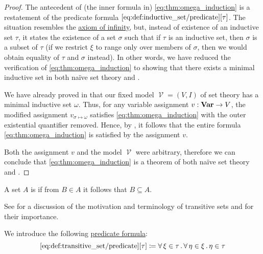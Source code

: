\begin{proof}
  The antecedent of (the inner formula in) \eqref{eq:thm:omega_induction} is a restatement of the predicate formula \( \ref{eq:def:inductive_set/predicate}[\tau] \). The situation resembles the \hyperref[eq:def:zfc/infinity]{axiom of infinity}, but, instead of existence of an inductive set \( \tau \), it states the existence of a set \( \sigma \) such that if \( \tau \) is an inductive set, then \( \sigma \) is a subset of \( \tau \) (if we restrict \( \xi \) to range only over members of \( \sigma \), then we would obtain equality of \( \tau \) and \( \sigma \) instead). In other words, we have reduced the verification of \eqref{eq:thm:omega_induction} to showing that there exists a minimal inductive set in both na\"ive set theory and .

  We have already proved in  that our fixed model \( \mscrV = (V, I) \) of set theory has a minimal inductive set \( \omega \). Thus, for any variable assignment \( v: \operatorname{\mathbf{Var}} \to V \), the modified assignment \( v_{\sigma \mapsto \omega} \) satisfies \eqref{eq:thm:omega_induction} with the outer existential quantifier removed. Hence, by , it follows that the entire formula \eqref{eq:thm:omega_induction} is satisfied by the assignment \( v \).

  Both the assignment \( v \) and the model \( \mscrV \) were arbitrary, therefore we can conclude that \eqref{eq:thm:omega_induction} is a theorem of both na\"ive set theory and .
\end{proof}

\begin{definition}\label{def:transitive_set}
  A set \( A \) is  if from \( B \in A \) it follows that \( B \subseteq A \).

  See  for a discussion of the motivation and terminology of transitive sets and  for their importance.

  We introduce the following \hyperref[rem:predicate_formula]{predicate formula}:
  \begin{equation*}\taglabel[\op{IsSetTransitive}]{eq:def:transitive_set/predicate}
    \ref{eq:def:transitive_set/predicate}[\tau] \coloneqq \qforall {\xi \in \tau} \qforall {\eta \in \xi} {\eta \in \tau}
  \end{equation*}
\end{definition}


